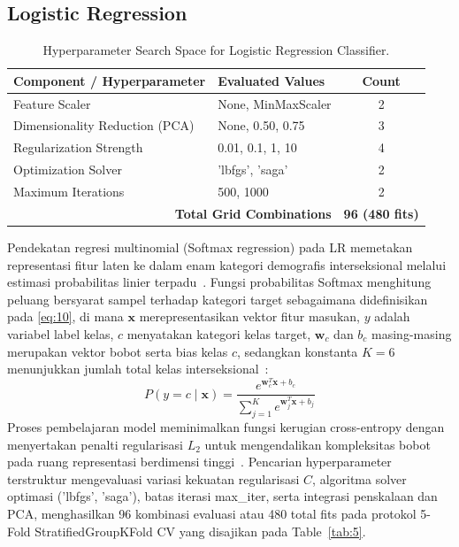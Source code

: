 \subsection{Logistic Regression}
\label{sec:logistic_regression}

\begin{table}[htbp]
\caption{Hyperparameter Search Space for Logistic Regression Classifier.}
\label{tab:5}
\label{tab:V}
\label{tab:lr_params}
\centering
\footnotesize
\begin{tabular}{llc}
\toprule
Component / Hyperparameter & Evaluated Values & Count \\
\midrule
Feature Scaler & None, MinMaxScaler & 2 \\
Dimensionality Reduction (PCA) & None, 0.50, 0.75 & 3 \\
Regularization Strength & 0.01, 0.1, 1, 10 & 4 \\
Optimization Solver & 'lbfgs', 'saga' & 2 \\
Maximum Iterations & 500, 1000 & 2 \\
\midrule
\multicolumn{2}{r}{\textbf{Total Grid Combinations}} & \textbf{96 (480 fits)} \\
\bottomrule
\end{tabular}
\end{table}

Pendekatan regresi multinomial (Softmax regression) pada LR memetakan representasi fitur laten ke dalam enam kategori demografis interseksional melalui estimasi probabilitas linier terpadu~\cite{ref37}. Fungsi probabilitas Softmax menghitung peluang bersyarat sampel terhadap kategori target sebagaimana didefinisikan pada \eqref{eq:10}, di mana $\mathbf{x}$ merepresentasikan vektor fitur masukan, $y$ adalah variabel label kelas, $c$ menyatakan kategori kelas target, $\mathbf{w}_c$ dan $b_c$ masing-masing merupakan vektor bobot serta bias kelas $c$, sedangkan konstanta $K = 6$ menunjukkan jumlah total kelas interseksional~\cite{ref38}:
\begin{equation}
P(y = c \mid \mathbf{x}) = \frac{e^{\mathbf{w}_c^T \mathbf{x} + b_c}}{\sum_{j=1}^K e^{\mathbf{w}_j^T \mathbf{x} + b_j}}
\label{eq:10}
\end{equation}
Proses pembelajaran model meminimalkan fungsi kerugian cross-entropy dengan menyertakan penalti regularisasi $L_2$ untuk mengendalikan kompleksitas bobot pada ruang representasi berdimensi tinggi~\cite{ref39}. Pencarian hyperparameter terstruktur mengevaluasi variasi kekuatan regularisasi $C$, algoritma solver optimasi ('lbfgs', 'saga'), batas iterasi max\_iter, serta integrasi penskalaan dan PCA, menghasilkan 96 kombinasi evaluasi atau 480 total fits pada protokol 5-Fold StratifiedGroupKFold CV yang disajikan pada Table~\ref{tab:5}.
